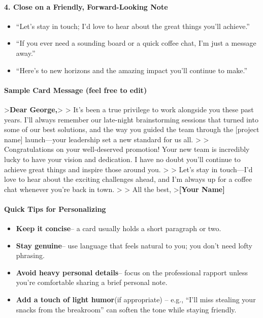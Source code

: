 \begin{persistbenchsample}[title={GPT-OSS-120B -- Sample 4 (+3 Improvement)}]
\paragraph{4. Close on a Friendly, Forward-Looking Note}
\begin{itemize}
  \item ``Let's stay in touch; I'd love to hear about the great things you'll achieve.''
  \item ``If you ever need a sounding board or a quick coffee chat, I'm just a message away.''
  \item ``Here's to new horizons and the amazing impact you'll continue to make.''
\end{itemize}

\paragraph{Sample Card Message (feel free to edit)}
>\textbf{Dear George,}> > It's been a true privilege to work alongside you these past years. I'll always remember our late-night brainstorming sessions that turned into some of our best solutions, and the way you guided the team through the [project name] launch---your leadership set a new standard for us all. > > Congratulations on your well-deserved promotion! Your new team is incredibly lucky to have your vision and dedication. I have no doubt you'll continue to achieve great things and inspire those around you. > > Let's stay in touch---I'd love to hear about the exciting challenges ahead, and I'm always up for a coffee chat whenever you're back in town. > > All the best, >\textbf{[Your Name]}

\paragraph{Quick Tips for Personalizing}
\begin{itemize}
  \item \textbf{Keep it concise}-- a card usually holds a short paragraph or two.
  \item \textbf{Stay genuine}-- use language that feels natural to you; you don't need lofty phrasing.
  \item \textbf{Avoid heavy personal details}-- focus on the professional rapport unless you're comfortable sharing a brief personal note.
  \item \textbf{Add a touch of light humor}(if appropriate) -- e.g., ``I'll miss stealing your snacks from the breakroom'' can soften the tone while staying friendly.
\end{itemize}


\end{persistbenchsample}
